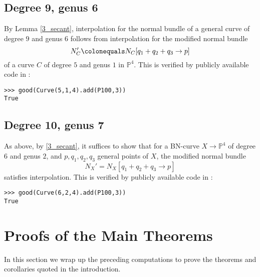 \documentclass[11pt]{amsart}
\newcommand{\pp}{\mathbb{P}}
\renewcommand{\bar}{\overline}
\theoremstyle{definition}
\theoremstyle{remark}
\begin{document}
\subsection{Degree 9, genus 6}\label{9_6}

By Lemma \ref{3_secant}, interpolation for the normal bundle of a general curve of degree $9$ and genus $6$ follows from interpolation for the modified normal bundle
\[N_C' \colonequals N_C[q_1+q_2+q_3 \to p]\]
of a curve $C$ of degree $5$ and genus $1$ in $\pp^4$.
This is verified by publicly available code in \cite[Appendix B]{joint}:

\begin{verbatim}
>>> good(Curve(5,1,4).add(P100,3))
True
\end{verbatim}

%

\subsection{Degree 10, genus 7} \label{10_7}

As above, by \ref{3_secant}, it suffices to show that for a BN-curve $X \to \pp^4$ of degree $6$ and genus $2$, and $p, q_1, q_2, q_3$ general points of $X$, the modified normal bundle
\[N_X' = N_X[q_1+q_2+q_3 \to p] \]
satisfies interpolation.  This is verified by publicly available code in \cite[Appendix B]{joint}:

\begin{verbatim}
>>> good(Curve(6,2,4).add(P100,3))
True
\end{verbatim}

\section{Proofs of the Main Theorems}\label{proofs}

In this section we wrap up the preceding computations to prove the theorems and corollaries quoted in the introduction.
\end{document}
